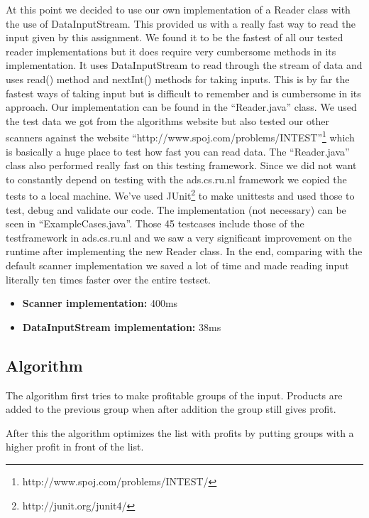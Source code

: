 \documentclass{article}
\begin{document}
At this point we decided to use our own implementation of a Reader class with the use of DataInputStream. This provided us with a really fast way to read the input given by this assignment. We found it to be the fastest of all our tested reader implementations but it does require very cumbersome methods in its implementation. It uses DataInputStream to read through the stream of data and uses read() method and nextInt() methods for taking inputs. This is by far the fastest ways of taking input but is difficult to remember and is cumbersome in its approach. Our implementation can be found in the ``Reader.java'' class. We used the test data we got from the algorithms website but also tested our other scanners against the website ``http://www.spoj.com/problems/INTEST''\footnote{\label{note1}http://www.spoj.com/problems/INTEST/} which is basically a huge place to test how fast you can read data. The ``Reader.java'' class also performed really fast on this testing framework.
\newline
\newline
Since we did not want to constantly depend on testing with the ads.cs.ru.nl framework we copied the tests to a local machine. We've used JUnit\footnote{\label{note1}http://junit.org/junit4/} to make unittests and used those to test, debug and validate our code. The implementation (not necessary) can be seen in ``ExampleCases.java''. Those 45 testcases include those of the testframework in ads.cs.ru.nl and we saw a very significant improvement on the runtime after implementing the new Reader class. In the end, comparing with the default scanner implementation we saved a lot of time and made reading input literally ten times faster over the entire testset.
\begin{itemize}
\item \textbf{Scanner implementation:} 400ms
\item \textbf{DataInputStream implementation:} 38ms
\end{itemize}

\subsection{Algorithm}
The algorithm first tries to make profitable groups of the input. Products are added to the previous group when after addition the group still gives profit.

After this the algorithm optimizes the list with profits by putting groups with a higher profit in front of the list.
\end{document}
